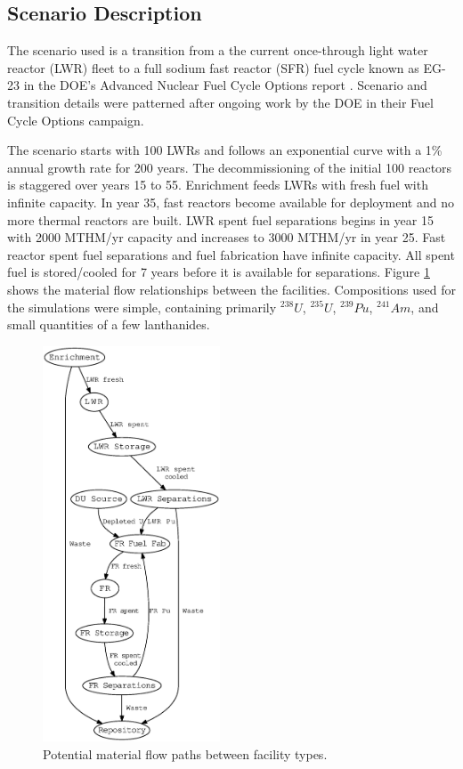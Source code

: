 \documentclass{style}
\begin{document}
\subsection{Scenario Description}

The scenario used is a transition from a the current once-through light water
reactor (LWR) fleet to a full sodium fast reactor (SFR) fuel cycle known as
EG-23 in the DOE's Advanced Nuclear Fuel Cycle Options report
\cite{wigeland_nuclear_2014}. Scenario and transition details were patterned
after ongoing work by the DOE in their Fuel Cycle Options campaign.

The scenario starts with 100 LWRs and follows an exponential curve with a 1\%
annual growth rate for 200 years.  The decommissioning of the initial 100
reactors is staggered over years 15 to 55.  Enrichment feeds LWRs with fresh
fuel with infinite capacity. In year 35, fast reactors become available for
deployment and no more thermal reactors are built.  LWR spent fuel separations
begins in year 15 with 2000 MTHM/yr capacity and increases to 3000 MTHM/yr in
year 25.  Fast reactor spent fuel separations and fuel fabrication have
infinite capacity.  All spent fuel is stored/cooled for 7 years before it is
available for separations. Figure \ref{fig:flow} shows the material flow
relationships between the facilities.  Compositions used for the simulations
were simple, containing primarily $^{238}U$, $^{235}U$, $^{239}Pu$,
$^{241}Am$, and small quantities of a few lanthanides.

\begin{figure}[!h]
    \centering
    \includegraphics[width=0.47\textwidth]{exp2/flow.eps}
    \caption[Material flow paths]{Potential material flow paths between facility types.}
    \label{fig:flow}
\end{figure}
\end{document}
